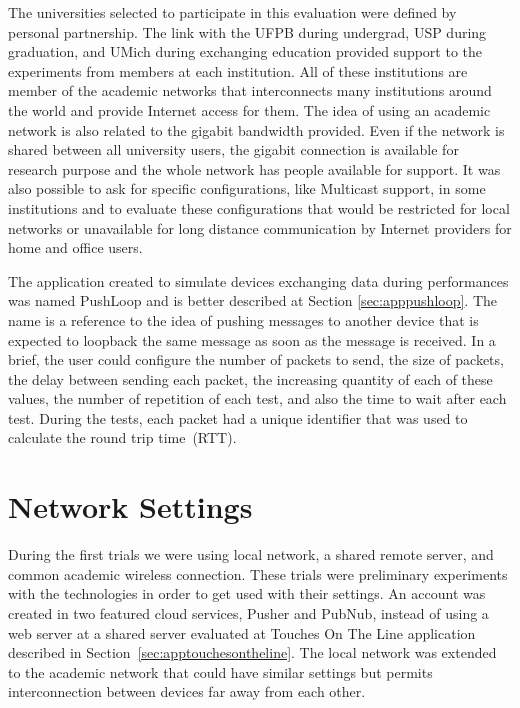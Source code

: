 The universities selected to participate in this evaluation were defined by personal partnership.
The link with the UFPB during undergrad, USP during graduation, and UMich during exchanging education provided support to the experiments from members at each institution.
All of these institutions are member of the academic networks that interconnects many institutions around the world and provide Internet access for them.
The idea of using an academic network is also related to the gigabit bandwidth provided.
Even if the network is shared between all university users, the gigabit connection is available for research purpose and the whole network has people available for support.
It was also possible to ask for specific configurations, like Multicast support, in some institutions and to evaluate these configurations that would be restricted for local networks or unavailable for long distance communication by Internet providers for home and office users.

The application created to simulate devices exchanging data during performances was named PushLoop and is better described at Section \ref{sec:apppushloop}.
The name is a reference to the idea of pushing messages to another device that is expected to loopback the same message as soon as the message is received.
In a brief, the user could configure the number of packets to send, the size of packets, the delay between sending each packet, the increasing quantity of each of these values, the number of repetition of each test, and also the time to wait after each test.
During the tests, each packet had a unique identifier that was used to calculate the round trip time~(RTT).

\section{Network Settings}
\label{sec:networksettings}


During the first trials we were using local network, a shared remote server, and common academic wireless connection.
These trials were preliminary experiments with the technologies in order to get used with their settings.
An account was created in two featured cloud services, Pusher and PubNub, instead of using a web server at a shared server evaluated at Touches On The Line application described in Section~\ref{sec:apptouchesontheline}.
The local network was extended to the academic network that could have similar settings but permits interconnection between devices far away from each other.

